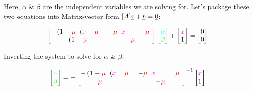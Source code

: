 \documentclass{article}
\newcommand{\cw}{\color{white}}
\newcommand{\cm}{\color{magenta}}
\newcommand{\cc}{\color{cyan}}
\newcommand{\cred}{\color{red}}
\newcommand{\cg}{\color{green}}
\begin{document}
Here, $\alpha$ \& $\beta$ are the independent variables we are solving for. Let's package these two equations into Matrix-vector form $[A]\underbar{\it{x}} + \underbar{\it{b}} = \underbar{0}$:

\begin{equation*}
    \begin{bmatrix}
        -\left(1 - \cred \mu \cw \right) \left(\cm x \cw + \cred \mu \cw\right)  &
        - \cred \mu \cw \left(\cm x \cw - 1 + \cred\mu\cw\right)
        \\
        - \left(1-\cred\mu\cw\right) &
        - \cred\mu\cw
    \end{bmatrix}
    \begin{bmatrix}
        \cc \alpha \\ \cg \beta
    \end{bmatrix}
    +
    \begin{bmatrix}
        \cm x \cw \\ 1
    \end{bmatrix}
    =
    \begin{bmatrix}
        0 \\ 0
    \end{bmatrix}
\end{equation*}

Inverting the system to solve for $\alpha$ \& $\beta$:

\begin{equation*}
    \begin{bmatrix}
        \cc \alpha \\ \cg \beta
    \end{bmatrix}
    = -
    \begin{bmatrix}
        -\left(1 - \cred \mu \cw \right) \left(\cm x \cw + \cred \mu \cw\right)  &
        - \cred \mu \cw \left(\cm x \cw - 1 + \cred\mu\cw\right)
        \\
        \cred\mu\cw - 1 &
        - \cred\mu\cw
    \end{bmatrix}^{-1}
    \begin{bmatrix}
        \cm x \cw \\ 1
    \end{bmatrix}
\end{equation*}
\end{document}
